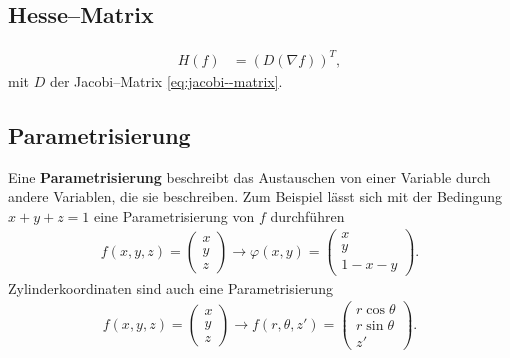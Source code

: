 \documentclass[a4paper,12pt]{article}
\numberwithin{equation}{section}
\begin{document}
\subsection{Hesse--Matrix}
\begin{align} 
        H\left(f\right)&=\left(D\left(\nabla f\right)\right)^T\label{eq:hesse--matrix}
,\end{align} 
mit $D$ der Jacobi--Matrix \eqref{eq:jacobi--matrix}.

\subsection{Parametrisierung}
Eine \textbf{Parametrisierung} beschreibt das Austauschen von einer Variable durch andere Variablen, die sie beschreiben. Zum Beispiel lässt sich mit der Bedingung $x+y+z=1$ eine Parametrisierung von $f$ durchführen
\begin{align} 
        f\left(x,y,z\right)=\begin{pmatrix}
                x\\y\\z
        \end{pmatrix}\rightarrow \varphi \left(x,y\right)=\begin{pmatrix}
                x\\y\\1-x-y
        \end{pmatrix}\label{eq:parametrisierung}
.\end{align} 
Zylinderkoordinaten sind auch eine Parametrisierung
\begin{align} 
        f\left(x,y,z\right)=\begin{pmatrix}
                x\\y\\z
        \end{pmatrix}\rightarrow f\left(r,\theta ,z'\right)=\begin{pmatrix}
                r\cos \theta \\r\sin \theta \\z'
        \end{pmatrix}
.\end{align} 


\end{document}
